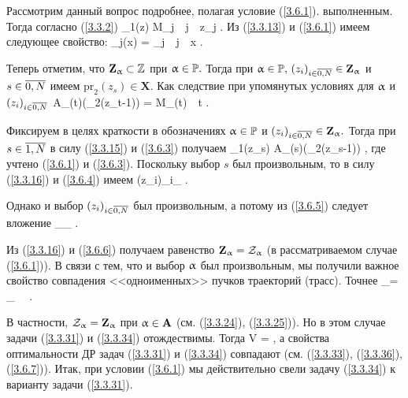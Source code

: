 Рассмотрим данный вопрос подробнее,
полагая условие
(\ref{3.6.1}).
выполненным.
Тогда согласно (\ref{3.3.2})
\bfn
  \label{3.6.1`}
  _1(z) \in M_j\ \ \fa j\in{}\ \ \fa z\in \bbm_j
  .
\efn
Из (\ref{3.3.13}) и (\ref{3.6.1})
имеем следующее свойство:
\bfn
  \label{3.6.2}
  \bba_j(x) = \bbm_j\ \ \fa j\in {}\ \ \fa x\in {}
  .
\efn

Теперь отметим, что
$\mathbf{Z}_\upalpha\subset {\mathbb Z}$
при $\upalpha\in{\mathbb P}.$
Тогда при
$\al\in \bbp,\, (z_i)_{i\in\ov{0,N}}\in \mathbf{Z}_\al$
и $s\in \ov{0,N}$  имеем
$\mathrm{pr}_2(z_s)\in \mathbf{X}.$
Как следствие при упомянутых условиях для
$\upalpha$ и $(z_i)_{i\in\ov{0,N}}$
\bfn
  \label{3.6.3}
  A_{\al(t)}\bigl(_2(z_{t-1})\bigl) = M_{\al(t)}\ \
  \fa t\in {}
  .
\efn

Фиксируем в целях краткости в обозначениях
$\upalpha\in {\mathbb P}$
и $(z_i)_{i\in\ov{0,N}}\in \mathbf{Z}_\al.$
Тогда при
$s\in \ov{1,N}$
в силу (\ref{3.3.15}) и (\ref{3.6.3})
получаем
\bfn
  \label{3.6.4}
  _1(z_s) \in A_{\al(s)}\bigl(_2(z_{s-1})\bigl)
  ,
\efn
где учтено (\ref{3.6.1}) и (\ref{3.6.3}).
Поскольку выбор $s$ был произвольным,
то в силу (\ref{3.3.16}) и (\ref{3.6.4})
имеем
\bfn
  \label{3.6.5}
  (z_i)_{i\in{}}\in \cz_\al
  .
\efn

Однако и выбор
$(z_i)_{i\in\ov{0,N}}$
был произвольным, а потому из
(\ref{3.6.5}) следует вложение
\bfn
  \label{3.6.6}
  _\al\su \cz_\al
  .
\efn

Из (\ref{3.3.16}) и (\ref{3.6.6})
получаем равенство
$\mathbf{Z}_\upalpha = {\cal Z}_\upalpha$
(в рассматриваемом случае (\ref{3.6.1})).
В связи с тем, что
и выбор $\upalpha$ был произвольным,
мы получили  важное свойство совпадения
<<одноименных>> пучков траекторий (трасс).
Точнее
\bfn
  \label{3.6.7}
  \cz_\al = _\al\ \ \fa \al\in \bbp
  .
\efn

В частности,
${\cal Z}_\upalpha = \mathbf{Z}_\upalpha$ при $\upalpha\in \mathbf{A}$
(см. (\ref{3.3.24}), (\ref{3.3.25})).
Но в этом случае задачи (\ref{3.3.31}) и
(\ref{3.3.34}) отождествимы.
Тогда
\bfn
  \label{3.6.8}
  V = 
  ,
\efn
а свойства оптимальности ДР задач
(\ref{3.3.31}) и (\ref{3.3.34}) совпадают
(см. (\ref{3.3.33}), (\ref{3.3.36}), (\ref{3.6.7})).
Итак, при условии
(\ref{3.6.1})
мы действительно свели задачу (\ref{3.3.34}) к варианту задачи
(\ref{3.3.31}).

